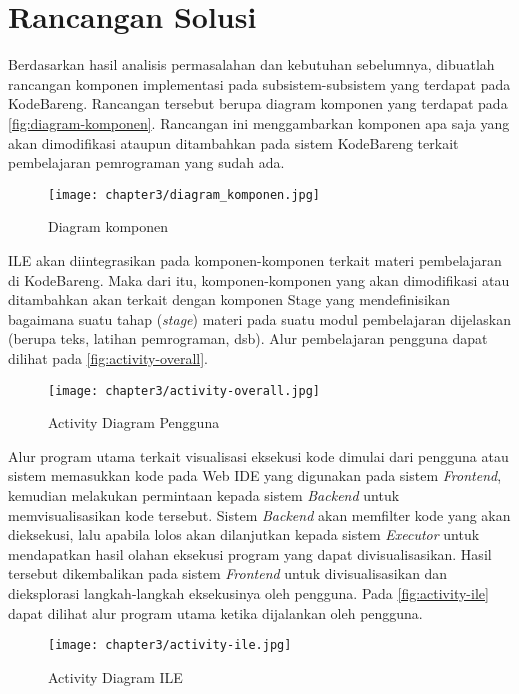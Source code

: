 \section{Rancangan Solusi}

Berdasarkan hasil analisis permasalahan dan kebutuhan sebelumnya, dibuatlah rancangan komponen implementasi pada subsistem-subsistem yang terdapat pada KodeBareng. Rancangan tersebut berupa diagram komponen yang terdapat pada \autoref{fig:diagram-komponen}. Rancangan ini menggambarkan komponen apa saja yang akan dimodifikasi ataupun ditambahkan pada sistem KodeBareng terkait pembelajaran pemrograman yang sudah ada.

\begin{figure}[H]
  \centering
  \texttt{[image: chapter3/diagram\_komponen.jpg]}
  \caption{Diagram komponen} \label{fig:diagram-komponen}
\end{figure}

ILE akan diintegrasikan pada komponen-komponen terkait materi pembelajaran di KodeBareng. Maka dari itu, komponen-komponen yang akan dimodifikasi atau ditambahkan akan terkait dengan komponen Stage yang mendefinisikan bagaimana suatu tahap (\textit{stage}) materi pada suatu modul pembelajaran dijelaskan (berupa teks, latihan pemrograman, dsb). Alur pembelajaran pengguna dapat dilihat pada \autoref{fig:activity-overall}.

\begin{figure}[H]
  \centering
  \texttt{[image: chapter3/activity-overall.jpg]}
  \caption{Activity Diagram Pengguna} \label{fig:activity-overall}
\end{figure}

Alur program utama terkait visualisasi eksekusi kode dimulai dari pengguna atau sistem memasukkan kode pada Web IDE yang digunakan pada sistem \textit{Frontend}, kemudian melakukan permintaan kepada sistem \textit{Backend} untuk memvisualisasikan kode tersebut. Sistem \textit{Backend} akan memfilter kode yang akan dieksekusi, lalu apabila lolos akan dilanjutkan kepada sistem \textit{Executor} untuk mendapatkan hasil olahan eksekusi program yang dapat divisualisasikan. Hasil tersebut dikembalikan pada sistem \textit{Frontend} untuk divisualisasikan dan dieksplorasi langkah-langkah eksekusinya oleh pengguna. Pada \autoref{fig:activity-ile} dapat dilihat alur program utama ketika dijalankan oleh pengguna.

\begin{figure}[H]
  \centering
  \texttt{[image: chapter3/activity-ile.jpg]}
  \caption{Activity Diagram ILE} \label{fig:activity-ile}
\end{figure}

